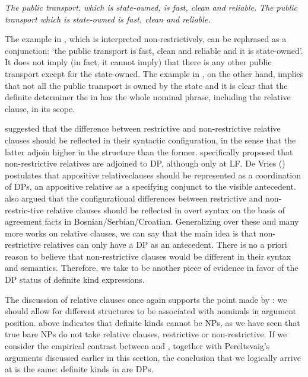 \documentclass[output=paper
,modfonts
,nonflat]{langsci/langscibook}
\begin{document}
	\ea\label{ex:borik:25}
	\ea\label{ex:borik:25a} 
	\textit{
		{\ob}{\ob}The public transport{\cb}, {\ob}which is state-owned{\cb}{\cb}, is fast, clean and reliable.
	}
	\ex\label{ex:borik:25b}
	\textit{
		{\ob}The {\ob}public transport which is state-owned{\cb}{\cb} is fast, clean and reliable.
	}
	\z
	\z
	
	The example in , which is interpreted non-restrictively, can be rephrased as a conjunction: `the public transport is fast, clean and reliable and it is state-owned'. It does not imply (in fact, it cannot imply) that there is any other public transport except for the state-owned. The example in , on the other hand, implies that not all the public transport is owned by the state and it is clear that the definite determiner the in  has the whole nominal phrase, including the relative clause, in its scope. 
	
	\citet{Jackendoff1977} suggested that the difference between restrictive and non-restrictive relative clauses should be reflected in their syntactic configuration, in the sense that the latter adjoin higher in the structure than the former. \citet{Demirdache1991} specifically proposed that non-restrictive relatives are adjoined to DP, although only at LF. De Vries (\citeyear{deVries2006}) postulates that appositive relative\linebreak clauses should be represented as a coordination of DPs, an appositive relative as a specifying conjunct to the visible antecedent. \citet{Arsenijevic2016} also argued that the configurational differences between restrictive and non-restric\hyp{}tive relative clauses should be reflected in overt syntax on the basis of agreement facts in Bosnian/Serbian/Croatian. Generalizing over these and many more works on relative clauses, we can say that the main idea is that non-restrictive relatives can only have a DP as an antecedent. There is no a priori reason to believe that  non-restrictive clauses would be different in their syntax and semantics. Therefore, we take  to be another piece of evidence in favor of the DP status of definite kind expressions. 
	
	The discussion of relative clauses once again supports the point made by \citet{Pereltsvaig2006}: we should allow for different structures to be associated with nominals in argument position.  above indicates that definite kinds cannot be NPs, as we have seen that true bare NPs do not take relative clauses, restrictive or non-restrictive. If we consider the empirical contrast between  and , together with Pereltsvaig's arguments discussed earlier in this section, the conclusion that we logically arrive at is the same: definite kinds in  are DPs.
	
\end{document}
